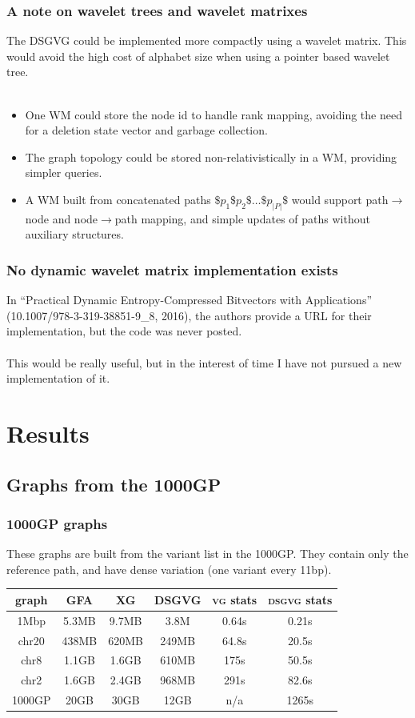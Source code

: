 \documentclass{beamer}
\begin{document}
\begin{frame}
  \frametitle{A note on wavelet trees and wavelet matrixes}
  The DSGVG could be implemented more compactly using a wavelet matrix.
  This would avoid the high cost of alphabet size when using a pointer based wavelet tree.
  \\~\\
  \begin{itemize}
  \item One WM could store the node id to handle rank mapping, avoiding the need for a deletion state vector and garbage collection.
  \item The graph topology could be stored non-relativistically in a WM, providing simpler queries.
  \item A WM built from concatenated paths $\$p_1\$p_2\$\ldots\$p_{|P|}\$$ would support path$\to$node and node$\to$path mapping, and simple updates of paths without auxiliary structures.
  \end{itemize}
\end{frame}

\begin{frame}
  \frametitle{No dynamic wavelet matrix implementation exists}
  In ``Practical Dynamic Entropy-Compressed Bitvectors with Applications'' (10.1007/978-3-319-38851-9\_8, 2016), the authors provide a URL for their implementation, but the code was never posted.
  \\~\\
  This would be really useful, but in the interest of time I have not pursued a new implementation of it.
\end{frame}

\section{Results}

\subsection{Graphs from the 1000GP}

\begin{frame}
  \frametitle{1000GP graphs}
  These graphs are built from the variant list in the 1000GP. They contain only the reference path, and have dense variation (one variant every 11bp).
  \begin{center}
  \begin{tabular}{ | c | c | c | c | c | c | }
    \hline
    graph & GFA & XG & DSGVG & \textsc{vg} stats & \textsc{dsgvg} stats \\
    \hline
    \hline
    1Mbp & 5.3MB & 9.7MB & 3.8M & 0.64s & 0.21s \\
    chr20 & 438MB & 620MB & 249MB & 64.8s & 20.5s \\
    chr8 & 1.1GB & 1.6GB & 610MB & 175s & 50.5s \\
    chr2 & 1.6GB & 2.4GB & 968MB & 291s & 82.6s \\
    1000GP & 20GB & 30GB & 12GB & n/a & 1265s \\
    \hline  
  \end{tabular}
  \end{center}
\end{frame}
\end{document}
